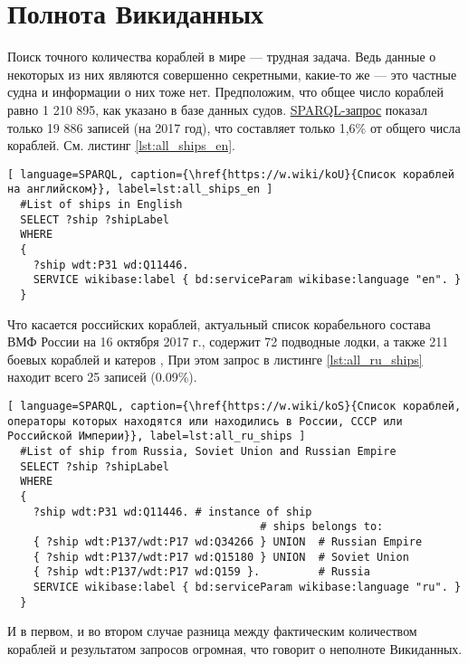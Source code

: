 \section{Полнота Викиданных}

Поиск точного количества кораблей в мире — трудная задача. Ведь данные о некоторых из них являются совершенно секретными, какие-то же — это частные судна и информации о них тоже нет. Предположим, что общее число кораблей равно 1 210 895, как указано в базе данных судов\cite{FleetMon}. \href{https://w.wiki/koU}{SPARQL-запрос} показал только 19 886 записей (на 2017 год), что составляет только 1,6\% от общего числа кораблей. См. листинг \ref{lst:all_ships_en}.


\begin{lstlisting}[ language=SPARQL, caption={\href{https://w.wiki/koU}{Список кораблей на английском}}, label=lst:all_ships_en ]
  #List of ships in English
  SELECT ?ship ?shipLabel
  WHERE
  {
    ?ship wdt:P31 wd:Q11446.
    SERVICE wikibase:label { bd:serviceParam wikibase:language "en". }
  }
\end{lstlisting}

Что касается российских кораблей, актуальный список корабельного состава ВМФ России на 16 октября 2017 г., содержит 72 подводные лодки, а также 211 боевых кораблей и катеров \cite{RussianShips}, При этом запрос в листинге \ref{lst:all_ru_ships} находит всего 25 записей (0.09\%).

\begin{lstlisting}[ language=SPARQL, caption={\href{https://w.wiki/koS}{Cписок кораблей, операторы которых находятся или находились в России, СССР или Российской Империи}}, label=lst:all_ru_ships ]
  #List of ship from Russia, Soviet Union and Russian Empire
  SELECT ?ship ?shipLabel
  WHERE
  {
    ?ship wdt:P31 wd:Q11446. # instance of ship
                                       # ships belongs to:
    { ?ship wdt:P137/wdt:P17 wd:Q34266 } UNION  # Russian Empire
    { ?ship wdt:P137/wdt:P17 wd:Q15180 } UNION  # Soviet Union
    { ?ship wdt:P137/wdt:P17 wd:Q159 }.         # Russia
    SERVICE wikibase:label { bd:serviceParam wikibase:language "ru". }
  }
\end{lstlisting}

И в первом, и во втором случае разница между фактическим количеством кораблей и результатом запросов огромная, что говорит о неполноте Викиданных.


